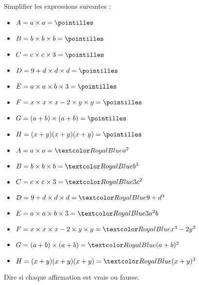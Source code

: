 \begin{Maquette}[Fiche,CorrigeFin,Colonnes=2]{}
\begin{multicols}{2}
      
      \begin{exercice}[SLF] %
         Simplifier les expressions suivantes :
         \begin{itemize}
            \item $A =a\times a =\pointilles$ \medskip
            \item $B =b\times b\times b =\pointilles$ \medskip
            \item $C =c\times c\times3 =\pointilles$ \medskip
            \item $D =9+d\times d\times d =\pointilles$ \medskip
            \item $E =a\times a\times b\times3 =\pointilles$ \medskip
            \item $F =x\times x\times x-2\times y\times y =\pointilles$ \medskip
            \item $G =(a+b)\times(a+b) =\pointilles$ \medskip
            \item $H =(x+y)(x+y)(x+y) =\pointilles$ \medskip
         \end{itemize}
      \end{exercice}
      
      \begin{Solution}
         \begin{itemize}
            \item $A =a\times a =\cor{a^2}$
            \item $B =b\times b\times b =\cor{b^3}$
            \item $C =c\times c\times3 =\cor{3c^2}$
            \item $D =9+d\times d\times d =\cor{9+d^3}$
            \item $E =a\times a\times b\times3 =\cor{3a^2b}$
            \item $F =x\times x\times x-2\times y\times y =\cor{x^3-2y^2}$
            \item $G =(a+b)\times(a+b) =\cor{(a+b)^2}$
            \item $H =(x+y)(x+y)(x+y) =\cor{(x+y)^3}$ \medskip
         \end{itemize}
      \end{Solution}
      
      
      \begin{exercice}[SLF] %
         Dire si chaque affirmation est vraie ou fausse. \par \medskip
      \end{exercice}
      

\end{multicols}
\end{Maquette}
